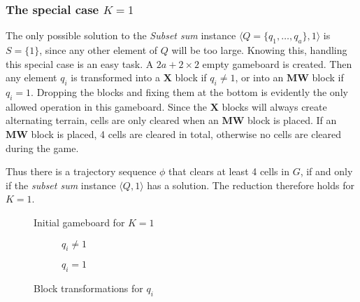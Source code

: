 \subsubsection{The special case $K = 1$}
The only possible solution to the \textit{Subset sum} instance $\langle Q = \{q_1, \ldots, q_a\}, 1 \rangle$ is $S = \{1\}$, since any other element of $Q$ will be too large. Knowing this, handling this special case is an easy task. A $2a+2 \times 2$ empty gameboard is created. Then any element $q_i$ is transformed into a $\mathbf{X}$ block if $q_i \not = 1$, or into an $\mathbf{MW}$ block if $q_i = 1$. Dropping the blocks and fixing them at the bottom is evidently the only allowed operation in this gameboard. Since the $\mathbf{X}$ blocks will always create alternating terrain, cells are only cleared when an $\mathbf{MW}$ block is placed. If an $\mathbf{MW}$ block is placed, 4 cells are cleared in total, otherwise no cells are cleared during the game.

Thus there is a trajectory sequence $\phi$ that clears at least 4 cells in $G$, if and only if the \textit{subset sum} instance $\langle Q, 1 \rangle$ has a solution. The reduction therefore holds for $K = 1$.

\begin{figure}[H]
    \centering
    \caption{Initial gameboard for $K=1$}
\end{figure}

\begin{figure}[H]
    \centering
    \begin{subfigure}[b]{0.10\textwidth}
        \caption{$q_i \not = 1$}
    \end{subfigure}
    \hspace{0.02\textwidth}
    \begin{subfigure}[b]{0.10\textwidth}
        \caption{$q_i = 1$}
    \end{subfigure}
    \caption{Block transformations for $q_i$}
\end{figure}
